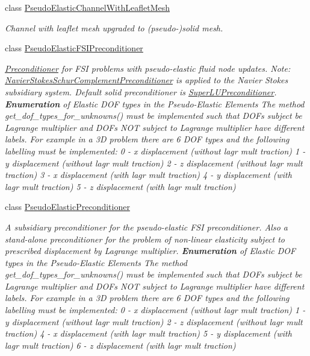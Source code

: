 \begin{DoxyCompactItemize}
class \hyperlink{classoomph_1_1PseudoElasticChannelWithLeafletMesh}{Pseudo\+Elastic\+Channel\+With\+Leaflet\+Mesh}
\begin{DoxyCompactList}\small\item\em Channel with leaflet mesh upgraded to (pseudo-\/)solid mesh. \end{DoxyCompactList}\item 
class \hyperlink{classoomph_1_1PseudoElasticFSIPreconditioner}{Pseudo\+Elastic\+F\+S\+I\+Preconditioner}
\begin{DoxyCompactList}\small\item\em \hyperlink{classoomph_1_1Preconditioner}{Preconditioner} for F\+SI problems with pseudo-\/elastic fluid node updates. Note\+: \hyperlink{classoomph_1_1NavierStokesSchurComplementPreconditioner}{Navier\+Stokes\+Schur\+Complement\+Preconditioner} is applied to the Navier Stokes subsidiary system. Default solid preconditioner is \hyperlink{classoomph_1_1SuperLUPreconditioner}{Super\+L\+U\+Preconditioner}. {\bfseries Enumeration} of Elastic D\+OF types in the Pseudo-\/\+Elastic Elements The method get\+\_\+dof\+\_\+types\+\_\+for\+\_\+unknowns() must be implemented such that D\+O\+Fs subject be Lagrange multiplier and D\+O\+Fs N\+OT subject to Lagrange multiplier have different labels. For example in a 3D problem there are 6 D\+OF types and the following labelling must be implemented\+: 0 -\/ x displacement (without lagr mult traction) 1 -\/ y displacement (without lagr mult traction) 2 -\/ z displacement (without lagr mult traction) 3 -\/ x displacement (with lagr mult traction) 4 -\/ y displacement (with lagr mult traction) 5 -\/ z displacement (with lagr mult traction) \end{DoxyCompactList}\item 
class \hyperlink{classoomph_1_1PseudoElasticPreconditioner}{Pseudo\+Elastic\+Preconditioner}
\begin{DoxyCompactList}\small\item\em A subsidiary preconditioner for the pseudo-\/elastic F\+SI preconditioner. Also a stand-\/alone preconditioner for the problem of non-\/linear elasticity subject to prescribed displacement by Lagrange multiplier. {\bfseries Enumeration} of Elastic D\+OF types in the Pseudo-\/\+Elastic Elements The method get\+\_\+dof\+\_\+types\+\_\+for\+\_\+unknowns() must be implemented such that D\+O\+Fs subject be Lagrange multiplier and D\+O\+Fs N\+OT subject to Lagrange multiplier have different labels. For example in a 3D problem there are 6 D\+OF types and the following labelling must be implemented\+: 0 -\/ x displacement (without lagr mult traction) 1 -\/ y displacement (without lagr mult traction) 2 -\/ z displacement (without lagr mult traction) 4 -\/ x displacement (with lagr mult traction) 5 -\/ y displacement (with lagr mult traction) 6 -\/ z displacement (with lagr mult traction) \end{DoxyCompactList}\item 

\end{DoxyCompactItemize}
